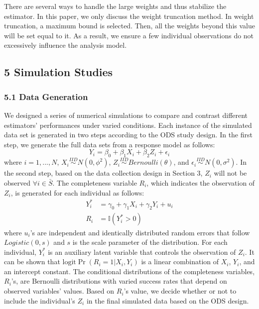 \documentclass[
  12pt,
]{article}
\begin{document}
There are several ways to handle the large weights and thus stabilize
the estimator. In this paper, we only discuss the weight truncation
method. In weight truncation, a maximum bound is selected. Then, all the
weights beyond this value will be set equal to it. As a result, we
ensure a few individual observations do not excessively influence the
analysis model.

\hypertarget{simulation-studies}{%
\subsection{5 Simulation Studies}\label{simulation-studies}}

\hypertarget{data-generation}{%
\subsubsection{5.1 Data Generation}\label{data-generation}}

We designed a series of numerical simulations to compare and contrast
different estimators' performances under varied conditions. Each
instance of the simulated data set is generated in two steps according
to the ODS study design. In the first step, we generate the full data
sets from a response model as follows: \[
Y_i = \beta_0 + \beta_1 X_i + \beta_2 Z_i + \epsilon_i
\] where \(i = 1,...,N\), \(X_i \overset{IID}{\sim} N(0, \phi^2)\),
\(Z_i \overset{IID}{\sim} Bernoulli(\theta)\), and
\(\epsilon_i \overset{IID}{\sim} N(0, \sigma^2)\). In the second step,
based on the data collection design in Section 3, \(Z_i\) will not be
observed \(\forall i \in \bar{S}\). The completeness variable \(R_i\),
which indicates the observation of \(Z_i\), is generated for each
individual as follows: \[
\begin{aligned}
Y_i^{*} &= \gamma_0 + \gamma_1 X_i + \gamma_2 Y_i + u_i \\
R_i &= \mathbb{I}(Y_i^{*} > 0)
\end{aligned}
\] where \(u_i\)'s are independent and identically distributed random
errors that follow \(Logistic(0, s)\) and \(s\) is the scale parameter
of the distribution. For each individual, \(Y_i^{*}\) is an auxiliary
latent variable that controls the observation of \(Z_i\). It can be
shown that \(\mathrm{logit} \Pr(R_i = 1 | X_i, Y_i)\) is a linear
combination of \(X_i\), \(Y_i\), and an intercept constant. The
conditional distributions of the completeness variables, \(R_i\)'s, are
Bernoulli distributions with varied success rates that depend on
observed variables' values. Based on \(R_i\)'s value, we decide whether
or not to include the individual's \(Z_i\) in the final simulated data
based on the ODS design.
\end{document}
